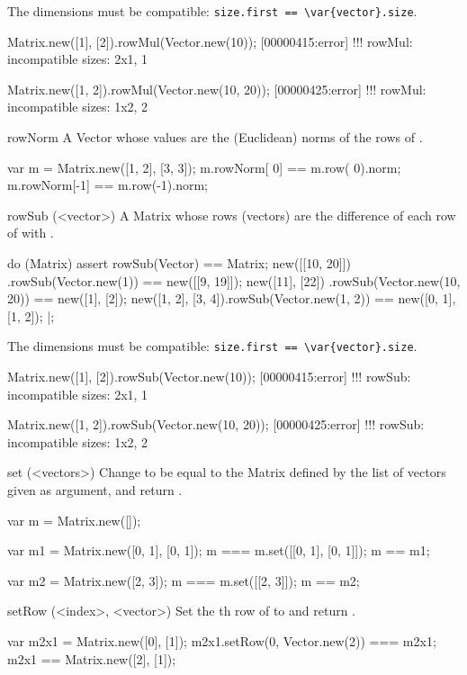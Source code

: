 \begin{urbiscriptapi}
  The dimensions must be compatible:
  \lstinline|size.first == \var{vector}.size|.
\begin{urbiscript}
Matrix.new([1], [2]).rowMul(Vector.new(10));
[00000415:error] !!! rowMul: incompatible sizes: 2x1, 1

Matrix.new([1, 2]).rowMul(Vector.new(10, 20));
[00000425:error] !!! rowMul: incompatible sizes: 1x2, 2
\end{urbiscript}


\item[rowNorm]%
  A Vector whose values are the (Euclidean) norms of the rows of \this.
\begin{urbiassert}
var m = Matrix.new([1, 2], [3, 3]);
m.rowNorm[ 0] == m.row( 0).norm;
m.rowNorm[-1] == m.row(-1).norm;
\end{urbiassert}


\item[rowSub](<vector>)%
  A Matrix whose rows (vectors) are the difference of each row of \this with
  .
\begin{urbiscript}
do (Matrix)
{
  assert
  {
    rowSub(Vector) == Matrix;
    new([[10, 20]])    .rowSub(Vector.new(1))      == new([[9, 19]]);
    new([11], [22])    .rowSub(Vector.new(10, 20)) == new([1], [2]);
    new([1, 2], [3, 4]).rowSub(Vector.new(1, 2))   == new([0, 1], [1, 2]);
  }
}|;
\end{urbiscript}

  The dimensions must be compatible:
  \lstinline|size.first == \var{vector}.size|.
\begin{urbiscript}
Matrix.new([1], [2]).rowSub(Vector.new(10));
[00000415:error] !!! rowSub: incompatible sizes: 2x1, 1

Matrix.new([1, 2]).rowSub(Vector.new(10, 20));
[00000425:error] !!! rowSub: incompatible sizes: 1x2, 2
\end{urbiscript}


\item[set](<vectors>)%
  Change \this to be equal to the Matrix defined by the list of vectors
  given as argument, and return \this.
\begin{urbiassert}
var m = Matrix.new([]);

var m1 = Matrix.new([0, 1], [0, 1]);
    m  ===    m.set([[0, 1], [0, 1]]);
    m  == m1;

var m2 = Matrix.new([2, 3]);
    m  ===    m.set([[2, 3]]);
    m  == m2;
\end{urbiassert}


\item[setRow](<index>, <vector>)%
  Set the th row of \this to  and return \this.
\begin{urbiassert}
var m2x1 = Matrix.new([0], [1]);
m2x1.setRow(0, Vector.new(2)) === m2x1;
m2x1 == Matrix.new([2], [1]);


\end{urbiassert}
\end{urbiscriptapi}
